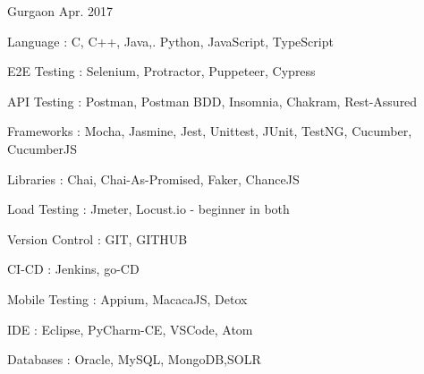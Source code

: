 





\begin{cventries}

  \cventry
    {} %
    {} %
    {Gurgaon} %
    {Apr. 2017} %
    {
      \begin{cvitems} %
        \item {Language : C, C++, Java,. Python, JavaScript, TypeScript}
        \item{E2E Testing : Selenium, Protractor, Puppeteer, Cypress}
        \item{API Testing : Postman, Postman BDD, Insomnia, Chakram, Rest-Assured}
        \item{Frameworks : Mocha, Jasmine, Jest, Unittest, JUnit, TestNG, Cucumber, CucumberJS}
        \item{Libraries : Chai, Chai-As-Promised, Faker, ChanceJS}
        \item{Load Testing : Jmeter, Locust.io - beginner in both}
        \item{Version Control : GIT, GITHUB}
        \item{CI-CD : Jenkins, go-CD}
        \item{Mobile Testing : Appium, MacacaJS, Detox}
        \item{IDE : Eclipse, PyCharm-CE, VSCode, Atom}
        \item{Databases : Oracle, MySQL, MongoDB,SOLR}
      \end{cvitems}
    }
    
    
\end{cventries}



